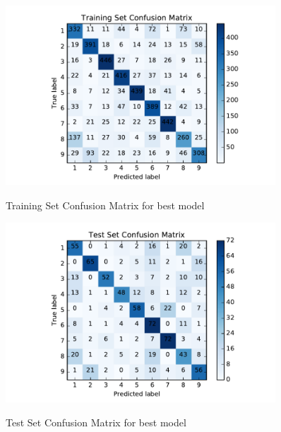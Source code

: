 \begin{figure}[H]
\centering
\includegraphics[width=0.9\textwidth]{./figures/originalTDNNtrain.pdf}\
\caption{\label{fig:BESTtrainMatrix} Training Set Confusion Matrix for best model}
\end{figure}


\begin{figure}[H]
\centering
\includegraphics[width=0.9\textwidth]{./figures/originalTDNNtest.pdf}\
\caption{\label{fig:BESTtestMatrix} Test Set Confusion Matrix for best model}
\end{figure}


\clearpage



